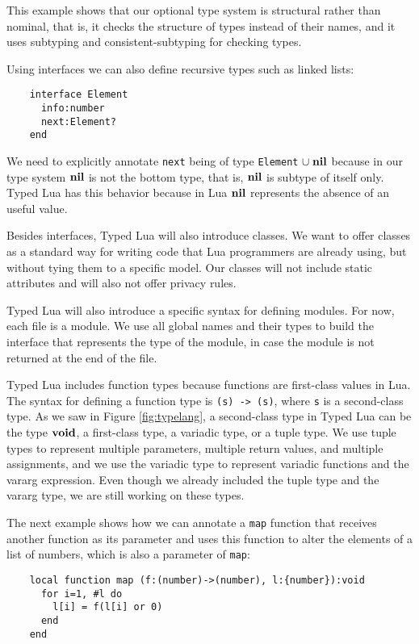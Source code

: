 This example shows that our optional type system is structural rather
than nominal, that is, it checks the structure of types instead of
their names, and it uses subtyping and consistent-subtyping for
checking types.

Using interfaces we can also define recursive types such as linked
lists:

\begin{verbatim}
    interface Element
      info:number
      next:Element?
    end
\end{verbatim}

We need to explicitly annotate \texttt{next} being of type
\texttt{Element}$\;\cup\;\mathbf{nil}$ because in our type system $\mathbf{nil}$
is not the bottom type, that is, $\mathbf{nil}$ is subtype of itself only.
Typed Lua has this behavior because in Lua $\mathbf{nil}$ represents
the absence of an useful value.

Besides interfaces, Typed Lua will also introduce classes.
We want to offer classes as a standard way for writing code that
Lua programmers are already using, but without tying them to a
specific model.
Our classes will not include static attributes and will also not offer
privacy rules.

Typed Lua will also introduce a specific syntax for defining modules.
For now, each file is a module.
We use all global names and their types to build the interface that
represents the type of the module, in case the module is not returned
at the end of the file.

Typed Lua includes function types because functions are first-class
values in Lua.
The syntax for defining a function type is \texttt{(s) -> (s)},
where \texttt{s} is a second-class type.
As we saw in Figure \ref{fig:typelang}, a second-class type in
Typed Lua can be the type $\mathbf{void}$, a first-class type, a variadic
type, or a tuple type.
We use tuple types to represent multiple parameters, multiple return
values, and multiple assignments, and we use the variadic type to
represent variadic functions and the vararg expression.
Even though we already included the tuple type and the vararg type,
we are still working on these types.

The next example shows how we can annotate a \texttt{map} function
that receives another function as its parameter and uses this
function to alter the elements of a list of numbers, which is
also a parameter of \texttt{map}:
\begin{verbatim}
    local function map (f:(number)->(number), l:{number}):void
      for i=1, #l do
        l[i] = f(l[i] or 0)
      end
    end
\end{verbatim}

